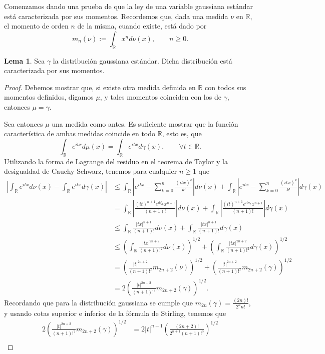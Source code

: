 \documentclass[letterpaper,twoside,12pt]{book}
\newcommand{\R}{\mathbb{R}}
\newcommand{\1}{\mathds{1}}
\newcommand{\abs}[1]{\left\lvert #1 \right\rvert}
\theoremstyle{definition}
\theoremstyle{definition}
\theoremstyle{remark}
\theoremstyle{definition}
\theoremstyle{definition}
\theoremstyle{definition}
\theoremstyle{definition}
\theoremstyle{definition}
\newtheorem{lema}{Lema}
\begin{document}
Comenzamos dando una prueba de que la ley de una variable gaussiana estándar está caracterizada por sus momentos. Recordemos que, dada una medida $\nu$ en $\R$, el momento de orden $n$ de la misma, cuando existe, está dado por 
\[
   m_n(\nu):=\int_{\R}x^{n}d\nu(x), \qquad n\geq0.
\]

\begin{lema} 
 Sea $\gamma$ la distribución gaussiana estándar. Dicha distribución está caracterizada por sus momentos.
 \end{lema}
 \begin{proof} 
    Debemos mostrar que, si existe otra medida definida en $\R$ con todos sus momentos definidos, digamos $\mu$, y  tales momentos coinciden con los de $\gamma$, entonces $\mu=\gamma$.

    Sea entonces $\mu$ una medida como antes. Es suficiente mostrar que la función característica de ambas medidas coincide en todo $\R$, esto es, que 
    \[
      \int_\R e^{itx}d\mu(x)=\int_\R e^{itx}d\gamma(x), \qquad \forall t\in \R.
    \]
    Utilizando la forma de Lagrange del residuo en el teorema de Taylor y la desigualdad de Cauchy-Schwarz, tenemos para cualquier $n\geq1$ que
    \begin{align*}
      \abs{\int_{\R}e^{itx}d\nu(x)-\int_\R e^{itx}d\gamma(x)}&\leq \int_\R \abs{e^{itx}-\sum_{k=0}^{n}\frac{(itx)^k}{k!}}d\nu(x)+\int_\R \abs{e^{itx}-\sum_{k=0}^{n}\frac{(itx)^k}{k!}}d\gamma(x)\\
      &=\int_\R \abs{\frac{(it)^{n+1}e^{it\xi_L}x^{n+1}}{(n+1)!}}d\nu(x)+\int_\R \abs{\frac{(it)^{n+1}e^{it\eta_L}x^{n+1}}{(n+1)!}}d\gamma(x)\\
      &\leq\int_\R \frac{\abs{tx}^{n+1}}{(n+1)!}d\nu(x)+\int_\R \frac{\abs{tx}^{n+1}}{(n+1)!}d\gamma(x)\\
      &\leq \left(\int_{\R}\frac{\abs{tx}^{2n+2}}{(n+1)!^2}d\nu(x)\right)^{1/2}+\left(\int_{\R}\frac{\abs{tx}^{2n+2}}{(n+1)!^2}d\gamma(x)\right)^{1/2}\\
      &=\left(\frac{\abs{t}^{2n+2}}{(n+1)!^2}m_{2n+2}(\nu)\right)^{1/2}+\left(\frac{\abs{t}^{2n+2}}{(n+1)!^2}m_{2n+2}(\gamma)\right)^{1/2}\\
      &=2\left(\frac{\abs{t}^{2n+2}}{(n+1)!^2}m_{2n+2}(\gamma)\right)^{1/2}.
    \end{align*}
   Recordando que para la distribución gaussiana se cumple que $m_{2n}(\gamma)=\frac{(2n)!}{2^{n}n!}$, y usando cotas superior e inferior de la fórmula de Stirling, tenemos que 
   \begin{align*}
      2\left(\frac{\abs{t}^{2n+2}}{(n+1)!^2}m_{2n+2}(\gamma)\right)^{1/2}&=2|t|^{n+1}\left(\frac{(2n+2)!}{2^{n+1}(n+1)!^3}\right)^{1/2}\\

\end{align*}
\end{proof}
\end{document}
